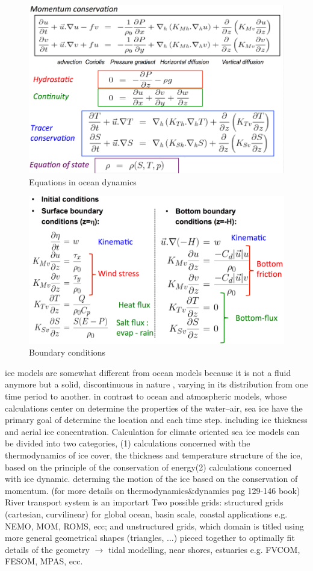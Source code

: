 \begin{figure}[htp!]
	\centering
	\includegraphics[width=0.5\linewidth]{uploads/Screenshot 2024-11-21 225126.png}
	\caption{Equations in ocean dynamics}
	\label{fig:equations in ocean dyn}
\end{figure}
\begin{figure}[htp!]
	\centering
	\includegraphics[width=0.5\linewidth]{uploads/Screenshot 2024-11-21 225410.png}
	\caption{Boundary conditions}
	\label{fig:boundary conditions}
\end{figure}
ice models are somewhat different from ocean models because it is not a fluid anymore but a solid, discontinuous in nature , varying in its distribution from one time period to another. in contrast to ocean and atmospheric models, whose calculations center on determine the properties of the water--air, sea ice have the primary goal of determine the location and each time step.  including ice thickness and aerial ice concentration. Calculation for climate oriented sea ice models can be divided into two categories, (1) calculations concerned with the thermodynamics of ice cover, the thickness and temperature structure of the ice, based on the principle of the conservation of energy(2) calculations concerned with ice dynamic.  determing the motion of the ice based on the conservation of momentum.
(for more details on thermodynamics\&dynamics pag 129-146 book)
River transport system
is an importart
Two possible grids: structured grids (cartesian, curvilinear) for global ocean, basin scale, coastal applications e.g. NEMO, MOM, ROMS, ecc; and unstructured grids, which domain is titled using more general geometrical shapes (triangles, ...) pieced together to optimally fit details of the geometry $\rightarrow$ tidal modelling, near shores, estuaries e.g. FVCOM, FESOM, MPAS, ecc.

